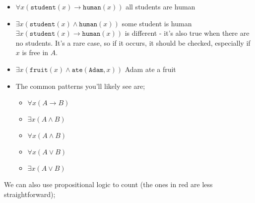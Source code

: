 \documentclass[a4paper, 12pt]{article}
\begin{document}
                \begin{itemize}
                    \itemsep0em
                    \item $\forall x (\texttt{student}(x) \rightarrow \texttt{human}(x))$ \hfill all students are human
                    \item $\exists x (\texttt{student}(x) \land \texttt{human}(x))$ \hfill some student is human
                        \subitem $\exists x (\texttt{student}(x) \rightarrow \texttt{human}(x))$ is different - it's also true when there are no students. It's a rare case, so if it occurs, it should be checked, especially if $x$ is free in $A$.
                    \item $\exists x (\texttt{fruit}(x) \land \texttt{ate}(\texttt{Adam}, x))$ \hfill Adam ate a fruit
                    \item The common patterns you'll likely see are;
                        \begin{itemize}
                            \item $\forall x (A \rightarrow B)$
                            \item $\exists x (A \land B)$
                            \item $\forall x (A \land B)$
                            \item $\forall x (A \lor B)$
                            \item $\exists x (A \lor B)$
                        \end{itemize}
                \end{itemize}
                We can also use propositional logic to count (the ones in red are less straightforward);
\end{document}
